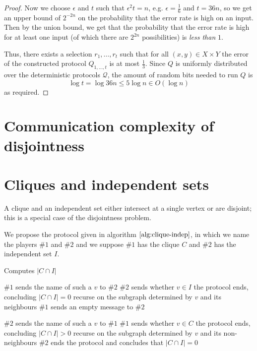 \documentclass[letterpaper,11pt]{article}
\begin{document}
\begin{proof}
    Now we choose $\epsilon$ and $t$ such that $\epsilon^2 t = n$, e.g.
    $\epsilon = \frac{1}{6}$ and $t = 36n$, so we get an upper bound of
    $2^{-2n}$ on the probability that the error rate is high on an input. Then
    by the union bound, we get that the probability that the error rate is high
    for at least one input (of which there are $2^{2n}$ possibilities) is
    \emph{less than} $1$.

    Thus, there exists a selection $r_1, \ldots, r_t$ such that for all $(x, y)
    \in X \times Y$ the error of the constructed protocol $Q_{1,\ldots,t}$ is
    at most $\frac{1}{3}$. Since $Q$ is uniformly distributed over the
    deterministic protocols $\mathcal{Q}$, the amount of random bits needed to
    run $Q$ is
    \begin{equation*}
        \log t = \log {36n} \leq 5 \log n \in O(\log n)
    \end{equation*}
    as required.
\end{proof}

\section{Communication complexity of disjointness}

\section{Cliques and independent sets}

A clique and an independent set either intersect at a single vertex or are
disjoint; this is a special case of the disjointness problem.

We propose the protocol given in algorithm $\ref{alg:clique-indep}$, in which
we name the players $\#1$ and $\#2$ and we suppose $\#1$ has the clique $C$ and
$\#2$ has the independent set $I$.

\begin{algorithm}
    \caption{Computes $|C \cap I|$}
    \begin{algorithmic}
            \State $\#1$ sends the name of such a $v$ to $\#2$
            \State $\#2$ sends whether $v \in I$
                \State the protocol ends, concluding $|C \cap I| = 0$
            \Else
                \State recurse on the subgraph determined by $v$ and its
                neighbours
            \EndIf
        \Else
            \State $\#1$ sends an empty message to $\#2$
        \EndIf

            \State $\#2$ sends the name of such a $v$ to $\#1$
            \State $\#1$ sends whether $v \in C$
                \State the protocol ends, concluding $|C \cap I| > 0$
            \Else
                \State recurse on the subgraph determined by $v$ and its
                non-neighbours
            \EndIf
        \Else
            $\#2$ ends the protocol and concludes that $|C \cap I| = 0$
        \EndIf
    \end{algorithmic}
    \label{alg:clique-indep}
\end{algorithm}
\end{document}
